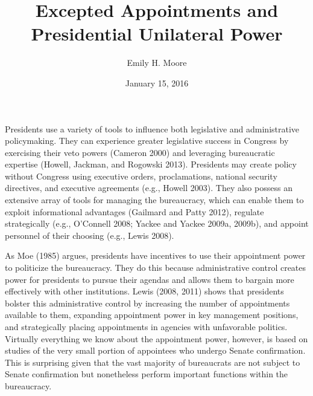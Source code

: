 \documentclass[12pt]{article}
\title{Excepted Appointments and Presidential Unilateral Power}
\date{January 15, 2016}
\author{Emily H. Moore}
\begin{document}

\maketitle
\parindent=0.5in
\parskip=0.01in
\doublespacing



Presidents use a variety of tools to influence both legislative and administrative policymaking. They can experience greater legislative success in Congress by exercising their veto powers (Cameron 2000) and leveraging bureaucratic expertise (Howell, Jackman, and Rogowski 2013). Presidents may create policy without Congress using executive orders, proclamations, national security directives, and executive agreements (e.g., Howell 2003). They  also possess an extensive array of tools for managing the bureaucracy, which can enable them to exploit informational advantages (Gailmard and Patty 2012), regulate strategically (e.g., O'Connell 2008; Yackee and Yackee 2009a, 2009b), and appoint personnel of their choosing (e.g., Lewis 2008). 

	As Moe (1985) argues, presidents have incentives to use their appointment power to politicize the bureaucracy. They do this because administrative control creates power for presidents to pursue their agendas and allows them to bargain more effectively with other institutions.  Lewis (2008, 2011) shows that presidents bolster this administrative control by increasing the number of appointments available to them, expanding appointment power in key management positions, and strategically placing appointments in agencies with unfavorable politics. Virtually everything we know about the appointment power, however, is based on studies of the very small portion of appointees who undergo Senate confirmation. This is surprising given that the vast majority of bureaucrats are not subject to Senate confirmation but nonetheless perform important functions within the bureaucracy.
	
\end{document}
